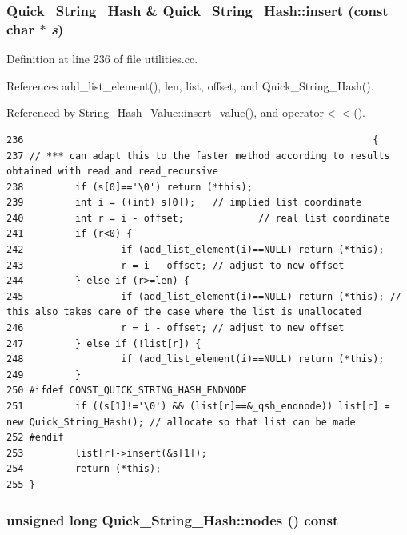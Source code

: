 \subsubsection{\setlength{\rightskip}{0pt plus 5cm}Quick\_\-String\_\-Hash \& Quick\_\-String\_\-Hash::insert (const char $\ast$ {\em s})}\label{classQuick__String__Hash_a2}




Definition at line 236 of file utilities.cc.

References add\_\-list\_\-element(), len, list, offset, and Quick\_\-String\_\-Hash().

Referenced by String\_\-Hash\_\-Value::insert\_\-value(), and operator$<$$<$().



\footnotesize\begin{verbatim}236                                                             {
237 // *** can adapt this to the faster method according to results obtained with read and read_recursive
238         if (s[0]=='\0') return (*this);
239         int i = ((int) s[0]);   // implied list coordinate
240         int r = i - offset;             // real list coordinate
241         if (r<0) {
242                 if (add_list_element(i)==NULL) return (*this);
243                 r = i - offset; // adjust to new offset
244         } else if (r>=len) {
245                 if (add_list_element(i)==NULL) return (*this); // this also takes care of the case where the list is unallocated
246                 r = i - offset; // adjust to new offset
247         } else if (!list[r]) {
248                 if (add_list_element(i)==NULL) return (*this);
249         }
250 #ifdef CONST_QUICK_STRING_HASH_ENDNODE
251         if ((s[1]!='\0') && (list[r]==&_qsh_endnode)) list[r] = new Quick_String_Hash(); // allocate so that list can be made
252 #endif
253         list[r]->insert(&s[1]);
254         return (*this);
255 }
\end{verbatim}\normalsize 
{}
\subsubsection{\setlength{\rightskip}{0pt plus 5cm}unsigned long Quick\_\-String\_\-Hash::nodes () const}\label{classQuick__String__Hash_a6}




